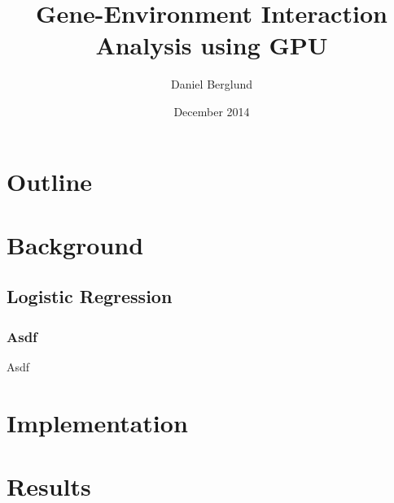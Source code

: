 \documentclass{beamer}
\title{Gene-Environment Interaction Analysis using GPU}
\author{Daniel Berglund}
\date{December 2014}
\begin{document}
\begin{frame}
 \titlepage
\end{frame}

\section*{Outline}
\begin{frame}
 \tableofcontents
\end{frame}

\section{Background}

\subsection{Logistic Regression}

\begin{frame}
\frametitle{Asdf}
 Asdf
\end{frame}

\section{Implementation}

\section{Results}
\end{document}
